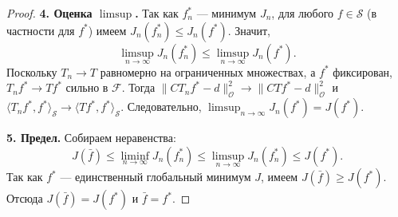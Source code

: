 \documentclass[a4paper,14pt,oneside,openany]{extarticle}
\begin{document}
\begin{proof}
\textbf{4. Оценка $\limsup$.}
Так как $f_n^*$ — минимум $J_n$, для любого $f \in \mathcal{S}$ (в частности для $f^*$) имеем $J_n(f_n^*) \le J_n(f^*)$. Значит,
\begin{equation}
    \limsup_{n\to\infty} J_n(f_n^*) \le \limsup_{n\to\infty} J_n(f^*).
\end{equation}
Поскольку $T_n \to T$ равномерно на ограниченных множествах, а $f^*$ фиксирован, $T_n f^* \to T f^*$ сильно в $\mathcal{F}$. Тогда $\|C T_n f^* - d\|_{\mathcal{O}}^2 \to \|C T f^* - d\|_{\mathcal{O}}^2$ и $\langle T_n f^*, f^*\rangle_{\mathcal{S}} \to \langle T f^*, f^*\rangle_{\mathcal{S}}$. Следовательно, $\limsup_{n\to\infty} J_n(f^*) = J(f^*)$.

\textbf{5. Предел.}
Собираем неравенства:
\begin{equation}
    J(\bar f) \le \liminf_{n\to\infty} J_n(f_n^*) \le \limsup_{n\to\infty} J_n(f_n^*) \le J(f^*).
\end{equation}
Так как $f^*$ — единственный глобальный минимум $J$, имеем $J(\bar f) \ge J(f^*)$. Отсюда $J(\bar f) = J(f^*)$ и $\bar f = f^*$.


\end{proof}
\end{document}
